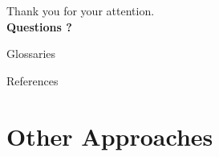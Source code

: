\documentclass[18pt]{beamer}
\begin{document}
\begin{frame}
\vfill
\centering
{\LARGE Thank you for your attention.}\\
\vspace{1cm}
{\Large \textbf{Questions ?}}
\vfill
\end{frame}

\appendix
\beginbackup

\begin{frame}[allowframebreaks]{Glossaries}
\printglossaries
\end{frame}

\begin{frame}[allowframebreaks]{References}
\printbibliography
\end{frame}

\section{Other Approaches}
\end{document}
